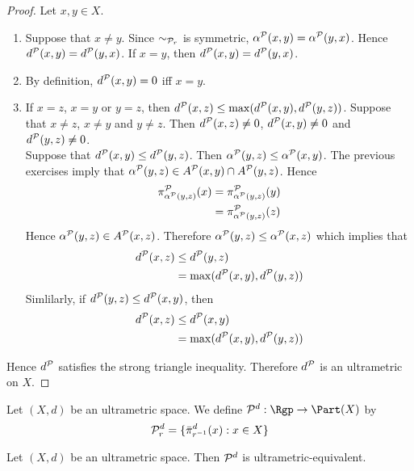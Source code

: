 \documentclass{book}
\begin{document}
\begin{proof}
	Let $x, y \in X$. 
	\begin{enumerate}
		\item Suppose that $x \neq y$. Since $\sim_{\mathcal{P}_r}$ is symmetric, $\alpha^{\mathcal{P}}(x,y) = \alpha^{\mathcal{P}}(y,x)$. Hence $d^{\mathcal{P}}(x,y) = d^{\mathcal{P}}(y,x)$. If $x = y$, then $d^{\mathcal{P}}(x,y) = d^{\mathcal{P}}(y,x)$. 
		\item By definition, $d^{\mathcal{P}}(x,y) = 0$ iff $x = y$.  
		\item If $x = z$, $x = y$ or $y=z$, then $d^{\mathcal{P}}(x,z) \leq \max(d^{\mathcal{P}}(x,y), d^{\mathcal{P}}(y,z))$. Suppose that $x \neq z$, $x \neq y$ and $y \neq z$. Then $d^{\mathcal{P}}(x,z) \neq 0$, $d^{\mathcal{P}}(x,y) \neq 0$ and $d^{\mathcal{P}}(y,z) \neq 0$. \\
		Suppose that $d^{\mathcal{P}}(x,y) \leq d^{\mathcal{P}}(y,z)$. Then $\alpha^{\mathcal{P}}(y,z) \leq \alpha^{\mathcal{P}}(x,y)$. The previous exercises imply that $\alpha^{\mathcal{P}}(y,z) \in A^{\mathcal{P}}(x,y) \cap A^{\mathcal{P}}(y,z)$. Hence
		\begin{align*}
			\pi^{\mathcal{P}}_{\alpha^{\mathcal{P}}(y,z)}(x) 
			& = \pi^{\mathcal{P}}_{\alpha^{\mathcal{P}}(y,z)}(y) \\
			& = \pi^{\mathcal{P}}_{\alpha^{\mathcal{P}}(y,z)}(z)
		\end{align*}
		Hence $\alpha^{\mathcal{P}}(y,z) \in A^{\mathcal{P}}(x, z)$. Therefore $\alpha^{\mathcal{P}}(y,z) \leq \alpha^{\mathcal{P}}(x,z)$ which implies that 
		\begin{align*}
			d^{\mathcal{P}}(x,z) 
			& \leq d^{\mathcal{P}}(y,z) \\
			& = \max(d^{\mathcal{P}}(x,y), d^{\mathcal{P}}(y,z))
		\end{align*}
		Simlilarly, if $d^{\mathcal{P}}(y,z) \leq d^{\mathcal{P}}(x,y)$, then 
		\begin{align*}
			d^{\mathcal{P}}(x,z) 
			& \leq d^{\mathcal{P}}(x,y) \\
			& = \max(d^{\mathcal{P}}(x,y), d^{\mathcal{P}}(y,z))
		\end{align*}
	\end{enumerate}
	Hence $d^{\mathcal{P}}$ satisfies the strong triangle inequality. Therefore $d^{\mathcal{P}}$ is an ultrametric on $X$.  
\end{proof}

\begin{defn}
	Let $(X, d)$ be an ultrametric space. We define $\MP^d: \Rgp \rightarrow \Part(X)$ by $$\mathcal{P}^d_r = \{\bar{\pi}^d_{r^{-1}}(x): x \in X\}$$
\end{defn}

\begin{ex}
	Let $(X, d)$ be an ultrametric space. Then $\mathcal{P}^d$ is ultrametric-equivalent.
\end{ex}
\end{document}
